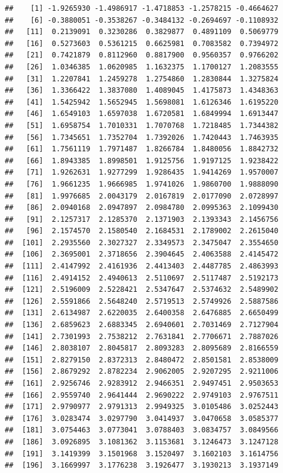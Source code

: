 \documentclass[
  11pt]{report}
\begin{document}
\begin{itemize}
\begin{verbatim}
##    [1] -1.9265930 -1.4986917 -1.4718853 -1.2578215 -0.4664627
##    [6] -0.3880051 -0.3538267 -0.3484132 -0.2694697 -0.1108932
##   [11]  0.2139091  0.3230286  0.3829877  0.4891109  0.5069779
##   [16]  0.5273603  0.5361215  0.6625981  0.7083582  0.7394972
##   [21]  0.7421879  0.8112960  0.8817900  0.9560357  0.9766202
##   [26]  1.0346385  1.0620985  1.1632375  1.1700127  1.2083555
##   [31]  1.2207841  1.2459278  1.2754860  1.2830844  1.3275824
##   [36]  1.3366422  1.3837080  1.4089045  1.4175873  1.4348363
##   [41]  1.5425942  1.5652945  1.5698081  1.6126346  1.6195220
##   [46]  1.6549103  1.6597038  1.6720581  1.6849994  1.6913447
##   [51]  1.6958754  1.7010331  1.7070768  1.7218485  1.7344382
##   [56]  1.7345651  1.7352704  1.7392026  1.7420443  1.7463935
##   [61]  1.7561119  1.7971487  1.8266784  1.8480056  1.8842732
##   [66]  1.8943385  1.8998501  1.9125756  1.9197125  1.9238422
##   [71]  1.9262631  1.9277299  1.9286435  1.9414269  1.9570007
##   [76]  1.9661235  1.9666985  1.9741026  1.9860700  1.9888090
##   [81]  1.9976685  2.0043179  2.0167819  2.0177090  2.0728997
##   [86]  2.0940168  2.0947897  2.0984780  2.0995363  2.1099430
##   [91]  2.1257317  2.1285370  2.1371903  2.1393343  2.1456756
##   [96]  2.1574570  2.1580540  2.1684531  2.1789002  2.2615040
##  [101]  2.2935560  2.3027327  2.3349573  2.3475047  2.3554650
##  [106]  2.3695001  2.3718656  2.3904645  2.4063588  2.4145472
##  [111]  2.4147992  2.4161936  2.4413403  2.4487785  2.4863993
##  [116]  2.4914152  2.4940613  2.5110697  2.5117487  2.5192173
##  [121]  2.5196009  2.5228421  2.5347647  2.5374632  2.5489902
##  [126]  2.5591866  2.5648240  2.5719513  2.5749926  2.5887586
##  [131]  2.6134987  2.6220035  2.6400358  2.6476885  2.6650499
##  [136]  2.6859623  2.6883345  2.6940601  2.7031469  2.7127904
##  [141]  2.7301993  2.7538212  2.7631841  2.7706671  2.7887026
##  [146]  2.8038107  2.8045817  2.8093283  2.8095689  2.8166559
##  [151]  2.8279150  2.8372313  2.8480472  2.8501581  2.8538009
##  [156]  2.8679292  2.8782234  2.9062005  2.9207295  2.9211006
##  [161]  2.9256746  2.9283912  2.9466351  2.9497451  2.9503653
##  [166]  2.9559740  2.9641444  2.9690222  2.9749103  2.9767511
##  [171]  2.9790977  2.9791313  2.9949325  3.0105486  3.0252443
##  [176]  3.0283474  3.0297790  3.0414937  3.0470658  3.0585377
##  [181]  3.0754463  3.0773041  3.0788403  3.0834757  3.0849566
##  [186]  3.0926895  3.1081362  3.1153681  3.1246473  3.1247128
##  [191]  3.1419399  3.1501968  3.1520497  3.1602103  3.1614756
##  [196]  3.1669997  3.1776238  3.1926477  3.1930213  3.1937149

\end{verbatim}
\end{itemize}
\end{document}
